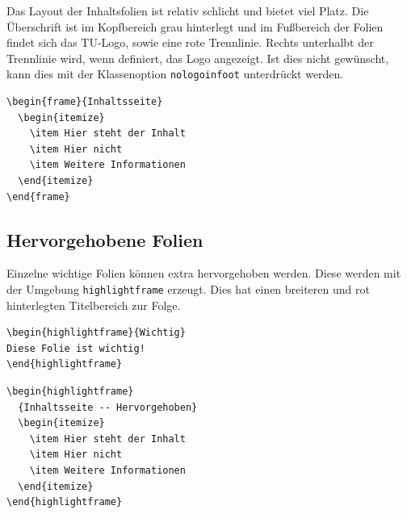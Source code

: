 \documentclass[cmyk,a4paper,colorscheme=green,TUBStitlepage=picture]{tubsreprt}
\begin{document}
Das Layout der Inhaltsfolien ist relativ schlicht und bietet viel Platz.
Die Überschrift ist im Kopfbereich grau hinterlegt und im Fußbereich der Folien
findet sich das TU-Logo, sowie eine rote Trennlinie.
Rechts unterhalbt der Trennlinie wird, wenn definiert, das Logo angezeigt.
Ist dies nicht gewünscht, kann dies mit der Klassenoption
\lstinline{nologoinfoot} unterdrückt werden.

\begin{minipage}{0.5\textwidth}
\begin{verbatim}
\begin{frame}{Inhaltsseite}
  \begin{itemize}
    \item Hier steht der Inhalt
    \item Hier nicht
    \item Weitere Informationen
  \end{itemize}
\end{frame}
\end{verbatim}
\end{minipage}
\begin{minipage}{0.5\textwidth}
\end{minipage}

\subsection{Hervorgehobene Folien}

Einzelne wichtige Folien können extra hervorgehoben werden. Diese werden mit
der Umgebung \lstinline{highlightframe} erzeugt. Dies hat einen breiteren und
rot hinterlegten Titelbereich zur Folge.

\begin{example}
\begin{lstlisting}
\begin{highlightframe}{Wichtig}
Diese Folie ist wichtig!
\end{highlightframe}
\end{lstlisting}
\end{example}

\begin{minipage}{0.5\textwidth}
\begin{verbatim}
\begin{highlightframe}
  {Inhaltsseite -- Hervorgehoben}
  \begin{itemize}
    \item Hier steht der Inhalt
    \item Hier nicht
    \item Weitere Informationen
  \end{itemize}
\end{highlightframe}
\end{verbatim}
\end{minipage}
\begin{minipage}{0.5\textwidth}
\end{minipage}
\end{document}
